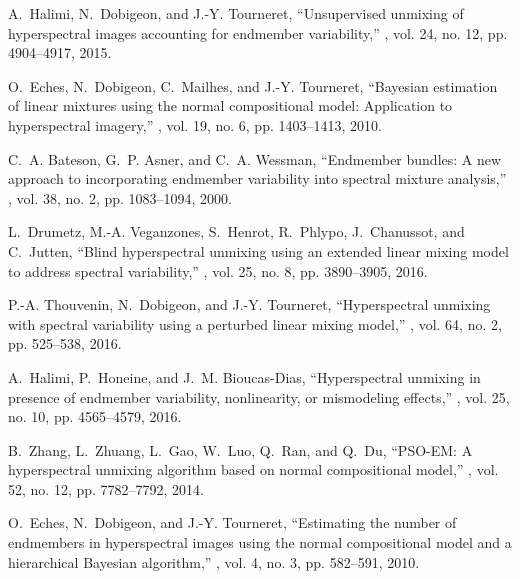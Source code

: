 \documentclass[twocolumn,english]{IEEEtran}
\theoremstyle{plain}
\begin{document}
\begin{thebibliography}{10}
A.~Halimi, N.~Dobigeon, and J.-Y. Tourneret,
\newblock ``Unsupervised unmixing of hyperspectral images accounting for
  endmember variability,''
, vol. 24, no. 12, pp.
  4904--4917, 2015.

O.~Eches, N.~Dobigeon, C.~Mailhes, and J.-Y. Tourneret,
\newblock ``Bayesian estimation of linear mixtures using the normal
  compositional model: Application to hyperspectral imagery,''
, vol. 19, no. 6, pp.
  1403--1413, 2010.

C.~A. Bateson, G.~P. Asner, and C.~A. Wessman,
\newblock ``Endmember bundles: A new approach to incorporating endmember
  variability into spectral mixture analysis,''
, vol. 38, no. 2,
  pp. 1083--1094, 2000.

L.~Drumetz, M.-A. Veganzones, S.~Henrot, R.~Phlypo, J.~Chanussot, and
  C.~Jutten,
\newblock ``Blind hyperspectral unmixing using an extended linear mixing model
  to address spectral variability,''
, vol. 25, no. 8, pp.
  3890--3905, 2016.

P.-A. Thouvenin, N.~Dobigeon, and J.-Y. Tourneret,
\newblock ``Hyperspectral unmixing with spectral variability using a perturbed
  linear mixing model,''
, vol. 64, no. 2, pp.
  525--538, 2016.

A.~Halimi, P.~Honeine, and J.~M. Bioucas-Dias,
\newblock ``Hyperspectral unmixing in presence of endmember variability,
  nonlinearity, or mismodeling effects,''
, vol. 25, no. 10, pp.
  4565--4579, 2016.

B.~Zhang, L.~Zhuang, L.~Gao, W.~Luo, Q.~Ran, and Q.~Du,
\newblock ``{PSO-EM}: A hyperspectral unmixing algorithm based on normal
  compositional model,''
, vol. 52, no. 12,
  pp. 7782--7792, 2014.

O.~Eches, N.~Dobigeon, and J.-Y. Tourneret,
\newblock ``Estimating the number of endmembers in hyperspectral images using
  the normal compositional model and a hierarchical {Bayesian} algorithm,''
, vol. 4,
  no. 3, pp. 582--591, 2010.


\end{thebibliography}
\end{document}
